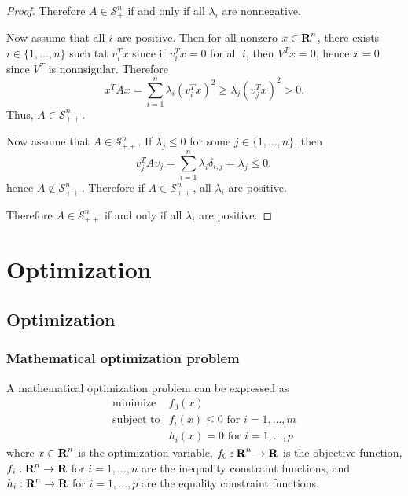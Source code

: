 \documentclass[10pt, twoside]{book}   	%
\newcommand{\possemidefset}[1]{\mathcal{S}_+^{#1}}
\newcommand{\posdefset}[1]{\mathcal{S}_{++}^{#1}}
\begin{document}
\begin{itemize}
\begin{proof}
Therefore $A\in\possemidefset{n}$ if and only if all $\lambda_i$ are nonnegative.

Now assume that all $\label_i$ are positive.
Then for all nonzero $x\in{\mbox{\bf R}}^n$,
there exists $i\in\{1,\ldots,n\}$ such tat $v_i^Tx$
since if $v_i^Tx=0$ for all $i$, then
$V^T x = 0$, hence $x=0$ since $V^T$ is nonnsigular.
Therefore
\begin{equation}
x^T A x = \sum_{i=1}^n \lambda_i (v_i^T x)^2
\geq \lambda_j (v_j^T x)^2 > 0.
\end{equation}
Thus, $A\in\posdefset{n}$.

Now assume that $A\in\posdefset{n}$.
If $\lambda_j \leq 0$ for some $j\in\{1,\ldots,n\}$,
then
\begin{equation}
v_j^T A v_j
= \sum_{i=1}^n \lambda_i \delta_{i,j}
= \lambda_j \leq 0,
\end{equation}
hence $A\not\in\posdefset{n}$. Therefore if $A\in\posdefset{n}$, all $\lambda_i$ are positive.

Therefore $A\in\posdefset{n}$ if and only if all $\lambda_i$ are positive.

\end{proof}



\end{itemize}

\part{Optimization}
\chapter{Optimization}

\section{Mathematical optimization problem}

A mathematical optimization problem can be expressed as
\begin{equation}
\label{eq:opt-prob}
\begin{array}{ll}
\mbox{minimize} & f_0(x)
\\
\mbox{subject to} & f_i(x) \leq 0 \mbox{ for } i = 1, \ldots, m
\\
& h_i(x) = 0 \mbox{ for } i = 1, \ldots, p
\end{array}
\end{equation}
where
$x\in{\mbox{\bf R}}^n$ is the optimization variable,
$f_0:{\mbox{\bf R}}^n\to{\mbox{\bf R}}$ is the objective function,
$f_i:{\mbox{\bf R}}^n\to{\mbox{\bf R}}$ for $i=1,\ldots,n$ are the inequality constraint functions,
and
$h_i:{\mbox{\bf R}}^n\to{\mbox{\bf R}}$ for $i=1,\ldots,p$ are the equality constraint functions.
\end{document}
